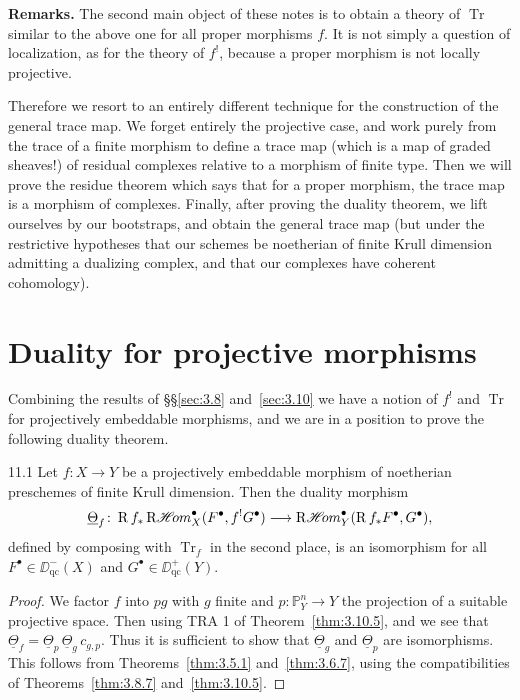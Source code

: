 \textbf{Remarks.}
The second main object of these notes is to obtain a theory of $\operatorname{Tr}$ similar to the above one for all proper morphisms $f$. It is not simply a question of localization, as for the theory of $f^!$, because a proper morphism is not locally projective.

Therefore we resort to an entirely different technique for the construction of the general trace map. We forget entirely the projective case, and work purely from the trace of a finite morphism to define a trace map (which is a map of graded sheaves!) of residual complexes relative to a morphism of finite type. Then we will prove the residue theorem which says that for a proper morphism, the trace map is a morphism of complexes. Finally, after proving the duality theorem, we lift ourselves by our bootstraps, and obtain the general trace map (but under the restrictive hypotheses that our schemes be noetherian of finite Krull dimension admitting a dualizing complex, and that our complexes have coherent cohomology).

\section{Duality for projective morphisms}\label{sec:3.11}

Combining the results of \S\S\ref{sec:3.8} and~\ref{sec:3.10} we have a notion of $f^!$ and $\operatorname{Tr}$ for projectively embeddable morphisms, and we are in a position to prove the following duality theorem.

\begin{booktheorem}{11.1}\label{thm:3.11.1}
Let $f\colon X\to Y$ be a projectively embeddable morphism of noetherian preschemes of finite Krull dimension. Then the duality morphism
\[
\underline{\Theta}_f \colon \operatorname{R} f_* \mathop{\mathrm{R}\mathscr{H}\!om}\nolimits_X^\bullet(F^\bullet, f^!G^\bullet) \longrightarrow \mathop{\mathrm{R}\mathscr{H}\!om}\nolimits_Y^\bullet(\operatorname{R} f_*F^\bullet, G^\bullet),
\]
defined by composing  with $\operatorname{Tr}_f$ in the second place, is an isomorphism for all $F^\bullet\in\DD_{\mathrm{qc}}^-(X)$ and $G^\bullet\in\DD_{\mathrm{qc}}^+(Y)$.
\end{booktheorem}

\begin{proof}
We factor $f$ into $pg$ with $g$ finite and $p\colon\mathbb{P}_Y^n\to Y$ the projection of a suitable projective space. Then using TRA 1 of Theorem~\ref{thm:3.10.5}, and  we see that $\underline{\Theta}_f=\underline{\Theta}_p\,\underline{\Theta}_g\,c_{g,p}$. Thus it is sufficient to show that $\underline{\Theta}_g$ and $\underline{\Theta}_p$ are isomorphisms. This follows from Theorems~\ref{thm:3.5.1} and~\ref{thm:3.6.7}, using the compatibilities of Theorems~\ref{thm:3.8.7} and~\ref{thm:3.10.5}.
\end{proof}

